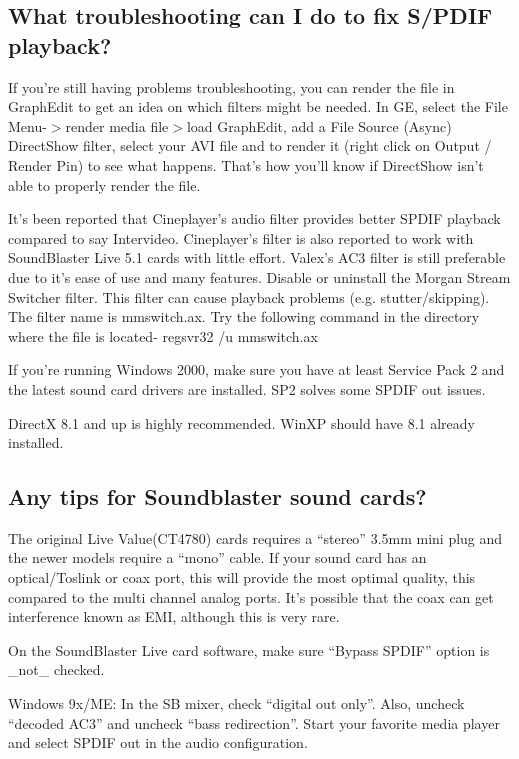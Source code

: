 ﻿\documentclass[12pt]{article}
\begin{document}
\subsection{What troubleshooting can I do to fix S/PDIF playback?}

If you're still having problems troubleshooting, you can render the file in GraphEdit to get an idea
on which filters might be needed. In GE, select the File Menu-$>$render media file$>$load GraphEdit,
add a File Source (Async) DirectShow filter, select your AVI file and to render it (right click on
Output / Render Pin) to see what happens. That's how you'll know if DirectShow isn't able to
properly render the file.

It's been reported that Cineplayer's audio filter provides better SPDIF playback compared to say
Intervideo. Cineplayer's filter is also reported to work with SoundBlaster Live 5.1 cards with
little effort. Valex's AC3 filter is still preferable due to it's ease of use and many features.
Disable or uninstall the Morgan Stream Switcher filter. This filter can cause playback problems
(e.g. stutter/skipping). The filter name is mmswitch.ax. Try the following command in the directory
where the file is located- regsvr32 /u mmswitch.ax


If you're running Windows 2000, make sure you have at least Service Pack 2 and the latest sound card
drivers are installed. SP2 solves some SPDIF out issues.

DirectX 8.1 and up is highly recommended. WinXP should have 8.1 already installed.

\subsection{Any tips for Soundblaster sound cards?}

The original Live Value(CT4780) cards requires a ``stereo'' 3.5mm mini plug and the newer models
require a ``mono'' cable. If your sound card has an optical/Toslink or coax port, this will provide
the most optimal quality, this compared to the multi channel analog ports. It's possible that the
coax can get interference known as EMI, although this is very rare.

On the SoundBlaster Live card software, make sure ``Bypass SPDIF'' option is \_not\_ checked.

Windows 9x/ME: In the SB mixer, check ``digital out only''. Also, uncheck ``decoded AC3'' and
uncheck ``bass redirection''. Start your favorite media player and select SPDIF out in the audio
configuration.
\end{document}
